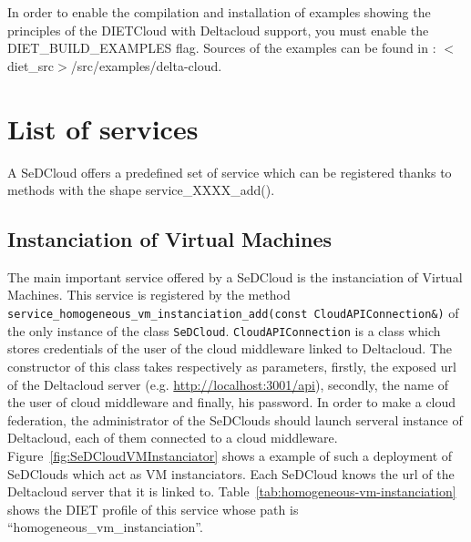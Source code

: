 In order to enable the compilation and installation of examples
showing the principles of the DIETCloud with Deltacloud support, you
must enable the DIET\_BUILD\_EXAMPLES flag. Sources of the examples
can be found in : $<$diet\_src$>$/src/examples/delta-cloud.


\section{List of services}

A SeDCloud offers a predefined set of service which can be registered
thanks to methods with the shape service\_XXXX\_add().

\subsection{Instanciation of Virtual Machines}

The main important service offered by a SeDCloud is the instanciation
of Virtual Machines. This service is registered by the method
\texttt{service\_homogeneous\_vm\_instanciation\_add(const
  CloudAPIConnection&)} of the only instance of the class
\texttt{SeDCloud}. \texttt{CloudAPIConnection} is a class which stores
credentials of the user of the cloud middleware linked to
Deltacloud. The constructor of this class takes respectively as
parameters, firstly, the exposed url of the Deltacloud server (e.g.
\url{http://localhost:3001/api}), secondly, the name of the user of
cloud middleware and finally, his password. In order to make a cloud
federation, the administrator of the SeDClouds should launch serveral
instance of Deltacloud, each of them connected to a cloud
middleware. Figure~\ref{fig:SeDCloudVMInstanciator} shows a example of
such a deployment of SeDClouds which act as VM instanciators.  Each
SeDCloud knows the url of the Deltacloud server that it is linked
to. Table~\ref{tab:homogeneous-vm-instanciation} shows the DIET
profile of this service whose path is
``homogeneous\_vm\_instanciation''.

